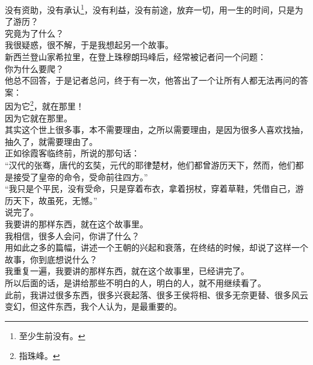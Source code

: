 \begin{multicols}{\theparacolNo}
没有资助，没有承认\footnote{至少生前没有。}，没有利益，没有前途，放弃一切，用一生的时间，只是为了游历？\\

究竟为了什么？\\

我很疑惑，很不解，于是我想起另一个故事。\\

新西兰登山家希拉里，在登上珠穆朗玛峰后，经常被记者问一个问题：\\

你为什么要爬？\\

他总不回答，于是记者总问，终于有一次，他答出了一个让所有人都无法再问的答案：\\

因为它\footnote{指珠峰。}，就在那里！\\

因为它就在那里。\\

其实这个世上很多事，本不需要理由，之所以需要理由，是因为很多人喜欢找抽，抽久了，就需要理由了。\\

正如徐霞客临终前，所说的那句话：\\

“汉代的张骞，唐代的玄奘，元代的耶律楚材，他们都曾游历天下，然而，他们都是接受了皇帝的命令，受命前往四方。”\\

“我只是个平民，没有受命，只是穿着布衣，拿着拐杖，穿着草鞋，凭借自己，游历天下，故虽死，无憾。”\\

说完了。\\

我要讲的那样东西，就在这个故事里。\\

我相信，很多人会问，你讲了什么？\\

用如此之多的篇幅，讲述一个王朝的兴起和衰落，在终结的时候，却说了这样一个故事，你到底想说什么？\\

我重复一遍，我要讲的那样东西，就在这个故事里，已经讲完了。\\

所以后面的话，是讲给那些不明白的人，明白的人，就不用继续看了。\\

此前，我讲过很多东西，很多兴衰起落、很多王侯将相、很多无奈更替、很多风云变幻，但这件东西，我个人认为，是最重要的。\\


\end{multicols}
